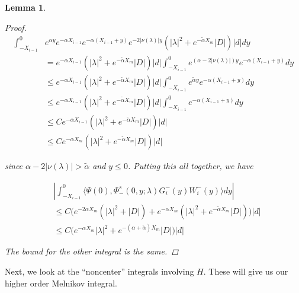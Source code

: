 \documentclass[12pt]{article}
\newtheorem{lemma}{Lemma}
\begin{document}
\begin{lemma}
\begin{proof}
\begin{align*}
\int_{-X_{i-1}}^0 &e^{\alpha y} e^{-\alpha X_{i-1}} e^{-\alpha(X_{i-1} + y)} e^{-2|\nu(\lambda)|y}( |\lambda|^2 + e^{-\tilde{\alpha} X_m}|D|)|d| dy \\
&= e^{-\alpha X_{i-1}} ( |\lambda|^2 + e^{-\tilde{\alpha} X_m}|D|)|d| \int_{-X_{i-1}}^0 e^{(\alpha - 2 |\nu(\lambda)|) y}  e^{-\alpha(X_{i-1} + y)} dy \\
&\leq e^{-\alpha X_{i-1}} ( |\lambda|^2 + e^{-\tilde{\alpha} X_m}|D|)|d| \int_{-X_{i-1}}^0 e^{\tilde{\alpha} y}  e^{-\alpha(X_{i-1} + y)} dy \\
&\leq e^{-\alpha X_{i-1}} ( |\lambda|^2 + e^{-\tilde{\alpha} X_m}|D|)|d| \int_{-X_{i-1}}^0 e^{-\alpha(X_{i-1} + y)} dy \\
&\leq C e^{-\alpha X_{i-1}} ( |\lambda|^2 + e^{-\tilde{\alpha} X_m}|D|)|d| \\
&\leq C e^{-\alpha X_m} ( |\lambda|^2 + e^{-\tilde{\alpha} X_m}|D|)|d|
\end{align*}

since $\alpha - 2 |\nu(\lambda)| > \tilde{\alpha}$ and $y \leq 0$. Putting this all together, we have

\begin{align*}
&\left| \int_{-X_{i-1}}^0 \langle \Psi(0), \Phi^s_-(0, y; \lambda) G_i^-(y) W_i^-(y) \rangle dy \right| \\
&\leq C \Big( e^{-2 \alpha X_m}( |\lambda|^2 + |D|) + e^{-\alpha X_m} ( |\lambda|^2 + e^{-\tilde{\alpha} X_m}|D|) \Big) |d| \\
&\leq C \Big( e^{-\alpha X_m} |\lambda|^2 + e^{-(\alpha + \tilde{\alpha}) X_m} |D| \Big) |d|
\end{align*}

The bound for the other integral is the same.

\end{proof}
\end{lemma}

Next, we look at the ``noncenter'' integrals involving $H$. These will give us our higher order Melnikov integral.

\end{document}
